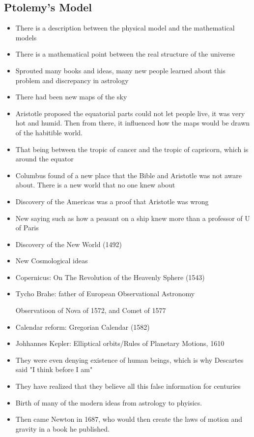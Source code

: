 \documentclass{article}
\begin{document}
\subsection{Ptolemy's Model}
\begin{itemize}
  \item There is a description between the physical model and the mathematical models
  \item There is a mathematical point between the real structure of the universe
  \item Sprouted many books and ideas, many new people learned about this
    problem and discrepancy in astrology
  \item There had been new maps of the sky
  \item Aristotle proposed the equatorial parts could not let people live,
    it was very hot and humid.
    Then from there, it influenced how the maps would be drawn of the habitible world.
  \item That being between the tropic of cancer and the tropic of capricorn,
    which is around the equator
  \item Columbus found of a new place that the Bible and Aristotle
    was not aware about. There is a new world that no one knew about
  \item Discovery of the Americas was a proof that Aristotle was wrong
  \item New saying such as how a peasant on a ship knew more than a professor
    of U of Paris
  \item Discovery of the New World (1492)
  \item New Cosmological ideas
  \item Copernicus: On The Revolution of the Heavenly Sphere (1543)
  \item Tycho Brahe: father of European Observational Astronomy

    Observatioon of Nova of 1572, and Comet of 1577
  \item Calendar reform: Gregorian Calendar (1582)
  \item Johhannes Kepler: Elliptical orbits/Rules of Planetary Motions, 1610
  \item They were even denying existence of human beings, which is
    why Descartes said "I think before I am"
  \item They have realized that they believe all this false information
    for centuries
  \item Birth of many of the modern ideas from astrology to phyisics.
  \item Then came Newton in 1687, who would then
    create the laws of motion and gravity in a book he published.

\end{itemize}
\end{document}
